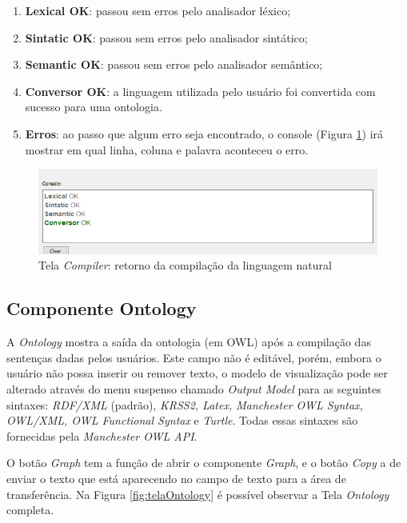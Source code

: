 \documentclass{bcc}
\begin{document}
\begin{enumerate}
  \item \textbf{Lexical OK}: passou sem erros pelo analisador léxico;
  \item \textbf{Sintatic OK}: passou sem erros pelo analisador sintático;
  \item \textbf{Semantic OK}: passou sem erros pelo analisador semântico;
  \item \textbf{Conversor OK}: a linguagem utilizada pelo usuário foi convertida com sucesso para uma ontologia.
  \item \textbf{Erros}: ao passo que algum erro seja encontrado, o console (Figura \ref{fig:telaCompiler2}) irá mostrar em qual linha, coluna e palavra aconteceu o erro.
\end{enumerate}

\begin{figure}[H]
\centering
\includegraphics[width=.8\textwidth]{Figuras/tela_compiler2.png}
\caption{Tela \textit{Compiler}: retorno da compilação da linguagem natural}
\label{fig:telaCompiler2}
\end{figure}

\subsection{Componente Ontology}
\label{sec:compOntology}

A \textit{Ontology} mostra a saída da ontologia (em OWL) após a compilação das sentenças dadas pelos usuários. Este campo não é editável, porém, embora o usuário não possa inserir ou remover texto, o modelo de visualização pode ser alterado através do menu suspenso chamado \textit{Output Model} para as seguintes sintaxes: \textit{RDF/XML} (padrão), \textit{KRSS2, Latex, Manchester OWL Syntax, OWL/XML, OWL Functional Syntax} e \textit{Turtle}. Todas essas sintaxes são fornecidas pela \textit{Manchester OWL API}. 

O botão \textit{Graph} tem a função de abrir o componente \textit{Graph}, e o botão \textit{Copy} a de enviar o texto que está aparecendo no campo de texto para a área de transferência. Na Figura \ref{fig:telaOntology} é possível observar a Tela \textit{Ontology} completa.
\end{document}

